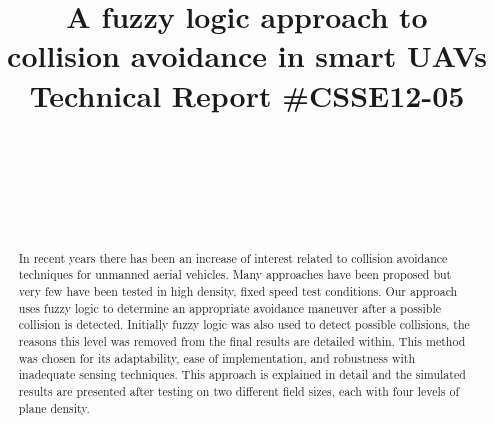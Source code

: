 \documentclass[10pt, conference, compsocconf]{IEEEtran}
\begin{document}
%
\title{A fuzzy logic approach to \\collision avoidance in smart UAVs \\ Technical Report \#CSSE12-05 \\}



\author{
\\
\\
\and
{}
\\
\\
}

\maketitle

\begin{abstract}
In recent years there has been an increase of interest related to collision avoidance techniques for unmanned aerial vehicles. Many approaches have been proposed but very few have been tested in high density, fixed speed test conditions. Our approach uses fuzzy logic to determine an appropriate avoidance maneuver after a possible collision is detected. Initially fuzzy logic was also used to detect possible collisions, the reasons this level was removed from the final results are detailed within.  This method was chosen for its adaptability, ease of implementation, and robustness with inadequate sensing techniques. This approach is explained in detail and the simulated results are presented after testing on two different field sizes, each with four levels of plane density. 
\end{abstract}
\end{document}
